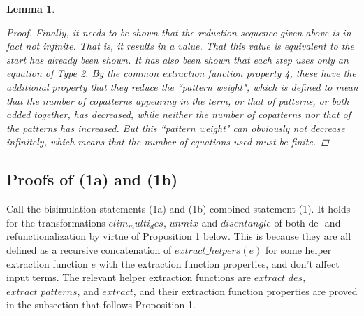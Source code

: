 \documentclass[11pt]{article} %
\newtheorem{lemma}{Lemma}
\begin{document}
\begin{lemma}
\begin{proof}
Finally, it needs to be shown that the reduction sequence given above is in fact not infinite. That is, it results in a value. That this value is equivalent to the start has already been shown. It has also been shown that each step uses only an equation of Type 2. By the common extraction function property 4, these have the additional property that they reduce the ``pattern weight", which is defined to mean that the number of copatterns appearing in the term, or that of patterns, or both added together, has decreased, while neither the number of copatterns nor that of the patterns has increased. But this ``pattern weight" can obviously not decrease infinitely, which means that the number of equations used must be finite.

\end{proof}

\end{lemma}

\subsection{Proofs of (1a) and (1b)}

Call the bisimulation statements (1a) and (1b) combined statement (1). It holds for the transformations $elim_multi_des$, $unmix$ and $disentangle$ of both de- and refunctionalization by virtue of Proposition 1 below. This is because they are all defined as a recursive concatenation of $extract\_helpers(e)$ for some helper extraction function $e$ with the extraction function properties, and don't affect input terms. The relevant helper extraction functions are $extract\_des$, $extract\_patterns$, and $extract$, and their extraction function properties are proved in the subsection that follows Proposition 1.
\end{document}
